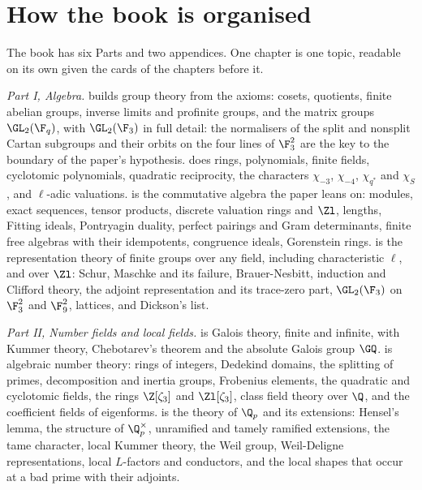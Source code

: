 \section*{How the book is organised}

The book has six Parts and two appendices. One chapter is one topic, readable on its own given the
cards of the chapters before it.

\emph{Part I, Algebra.}  builds group theory from the axioms: cosets, quotients,
finite abelian groups, inverse limits and profinite groups, and the matrix groups $\GL_2(\F_q)$,
with $\GL_2(\F_3)$ in full detail: the normalisers of the split and nonsplit Cartan subgroups and
their orbits on the four lines of $\F_3^2$ are the key to the boundary of the paper's hypothesis.
 does rings, polynomials, finite fields, cyclotomic polynomials, quadratic
reciprocity, the characters $\chi_{-3}$, $\chi_{-4}$, $\chi_{q^*}$ and $\chi_S$, and $\ell$-adic
valuations.  is the commutative algebra the paper leans on: modules, exact
sequences, tensor products, discrete valuation rings and $\Zl$, lengths, Fitting ideals, Pontryagin
duality, perfect pairings and Gram determinants, finite free algebras with their idempotents,
congruence ideals, Gorenstein rings.  is the representation theory of finite groups
over any field, including characteristic $\ell$, and over $\Zl$: Schur, Maschke and its failure,
Brauer-Nesbitt, induction and Clifford theory, the adjoint representation and its trace-zero part,
$\GL_2(\F_3)$ on $\F_3^2$ and $\F_9^2$, lattices, and Dickson's list.

\emph{Part II, Number fields and local fields.}  is Galois theory, finite and
infinite, with Kummer theory, Chebotarev's theorem and the absolute Galois group $\GQ$.
 is algebraic number theory: rings of integers, Dedekind domains, the splitting of
primes, decomposition and inertia groups, Frobenius elements, the quadratic and cyclotomic fields,
the rings $\Z[\zeta_3]$ and $\Zl[\zeta_3]$, class field theory over $\Q$, and the coefficient fields
of eigenforms.  is the theory of $\Q_p$ and its extensions: Hensel's lemma, the
structure of $\Q_p^\times$, unramified and tamely ramified extensions, the tame character, local
Kummer theory, the Weil group, Weil-Deligne representations, local $L$-factors and conductors, and
the local shapes that occur at a bad prime with their adjoints.

